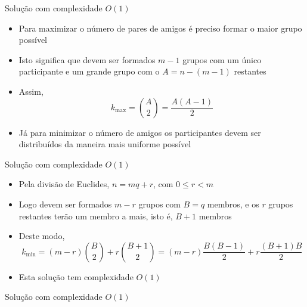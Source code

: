 \begin{frame}[fragile]{Solução com complexidade $O(1)$}

    \begin{itemize}
        \item Para maximizar o número de pares de amigos é preciso formar o maior grupo possível

        \item Isto significa que devem ser formados $m - 1$ grupos com um
            único participante e um grande grupo com o $A = n - (m - 1)$ restantes

        \item Assim,
        $$
            k_{\max} = \binom{A}{2} = \frac{A(A - 1)}{2}
        $$

        \item Já para minimizar o número de amigos os participantes devem ser distribuídos da
            maneira mais uniforme possível
    \end{itemize}

\end{frame}

\begin{frame}[fragile]{Solução com complexidade $O(1)$}

    \begin{itemize}
        \item Pela divisão de Euclides, $n = mq + r$, com $0\leq r < m$

        \item Logo devem ser formados $m - r$ grupos com $B = q$ membros, e os $r$ grupos
            restantes terão um membro a mais, isto é, $B + 1$ membros

        \item Deste modo,
        $$
            k_{\min} = (m - r)\binom{B}{2} + r\binom{B + 1}{2} = (m - r)\frac{B(B - 1)}{2} +
                r\frac{(B + 1)B}{2}
        $$

        \item Esta solução tem complexidade $O(1)$
    \end{itemize}

\end{frame}

\begin{frame}[fragile]{Solução com complexidade $O(1)$}
\end{frame}
